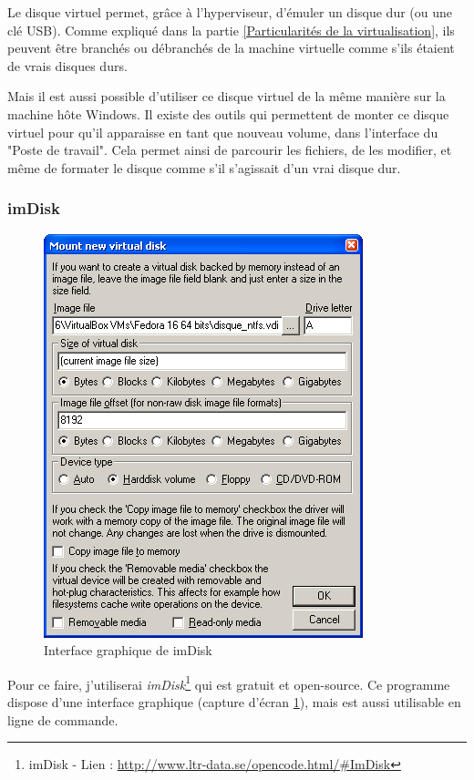Le disque virtuel permet, grâce à l'hyperviseur, d'émuler un disque dur (ou une clé USB).
Comme expliqué dans la partie \ref{Particularités de la virtualisation}, ils peuvent être branchés ou débranchés de la machine virtuelle comme s'ils étaient de vrais disques durs.

Mais il est aussi possible d'utiliser ce disque virtuel de la même manière sur la machine hôte Windows.
Il existe des outils qui permettent de monter ce disque virtuel pour qu'il apparaisse en tant que nouveau volume, dans l'interface du "Poste de travail".
Cela permet ainsi de parcourir les fichiers, de les modifier, et même de formater le disque comme s'il s'agissait d'un vrai disque dur.
\\




\subsubsection{imDisk}

\begin{figure}[!h]
	\center
	\includegraphics[scale=0.5]{images/imDisk.png}
	\caption{Interface graphique de imDisk}
	\label{Interface graphique de imDisk}
\end{figure}

Pour ce faire, j'utiliserai \textit{imDisk}\footnote{imDisk - Lien : \href{http://www.ltr-data.se/opencode.html/\#ImDisk}{http://www.ltr-data.se/opencode.html/\#ImDisk}} qui est gratuit et open-source.
Ce programme dispose d'une interface graphique (capture d'écran \ref{Interface graphique de imDisk}), mais est aussi utilisable en ligne de commande.
\\


